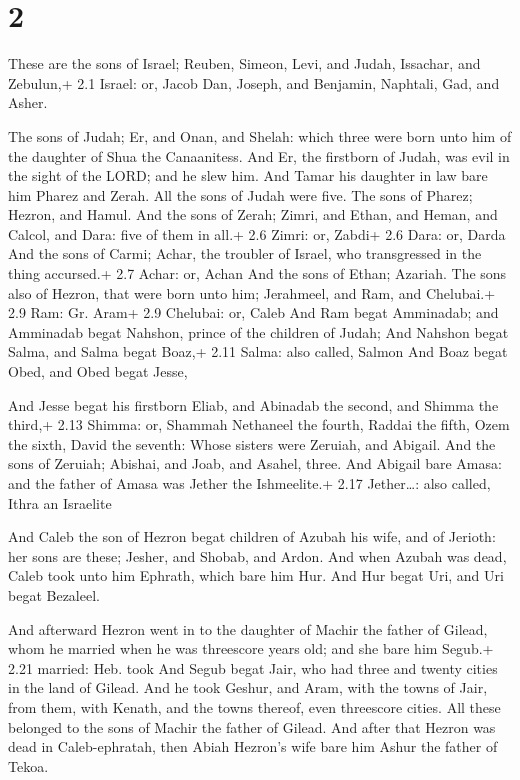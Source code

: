 \hypertarget{section-1}{%
\section{2}\label{section-1}}

 These are the sons of Israel; Reuben, Simeon, Levi, and
Judah, Issachar, and Zebulun,+ 2.1 Israel: or, Jacob  Dan,
Joseph, and Benjamin, Naphtali, Gad, and Asher.

 The sons of Judah; Er, and Onan, and Shelah: which three
were born unto him of the daughter of Shua the Canaanitess. And Er, the
firstborn of Judah, was evil in the sight of the LORD; and he slew him.
 And Tamar his daughter in law bare him Pharez and Zerah.
All the sons of Judah were five.  The sons of Pharez;
Hezron, and Hamul.  And the sons of Zerah; Zimri, and Ethan,
and Heman, and Calcol, and Dara: five of them in all.+ 2.6 Zimri: or,
Zabdi+ 2.6 Dara: or, Darda  And the sons of Carmi; Achar,
the troubler of Israel, who transgressed in the thing accursed.+ 2.7
Achar: or, Achan  And the sons of Ethan; Azariah.
 The sons also of Hezron, that were born unto him;
Jerahmeel, and Ram, and Chelubai.+ 2.9 Ram: Gr. Aram+ 2.9 Chelubai: or,
Caleb  And Ram begat Amminadab; and Amminadab begat
Nahshon, prince of the children of Judah;  And Nahshon
begat Salma, and Salma begat Boaz,+ 2.11 Salma: also called, Salmon
 And Boaz begat Obed, and Obed begat Jesse,

 And Jesse begat his firstborn Eliab, and Abinadab the
second, and Shimma the third,+ 2.13 Shimma: or, Shammah 
Nethaneel the fourth, Raddai the fifth,  Ozem the sixth,
David the seventh:  Whose sisters were Zeruiah, and
Abigail. And the sons of Zeruiah; Abishai, and Joab, and Asahel, three.
 And Abigail bare Amasa: and the father of Amasa was Jether
the Ishmeelite.+ 2.17 Jether\ldots: also called, Ithra an Israelite

 And Caleb the son of Hezron begat children of Azubah his
wife, and of Jerioth: her sons are these; Jesher, and Shobab, and Ardon.
 And when Azubah was dead, Caleb took unto him Ephrath,
which bare him Hur.  And Hur begat Uri, and Uri begat
Bezaleel.

 And afterward Hezron went in to the daughter of Machir
the father of Gilead, whom he married when he was threescore years old;
and she bare him Segub.+ 2.21 married: Heb. took  And Segub
begat Jair, who had three and twenty cities in the land of Gilead.
 And he took Geshur, and Aram, with the towns of Jair, from
them, with Kenath, and the towns thereof, even threescore cities. All
these belonged to the sons of Machir the father of Gilead. 
And after that Hezron was dead in Caleb-ephratah, then Abiah Hezron's
wife bare him Ashur the father of Tekoa.

